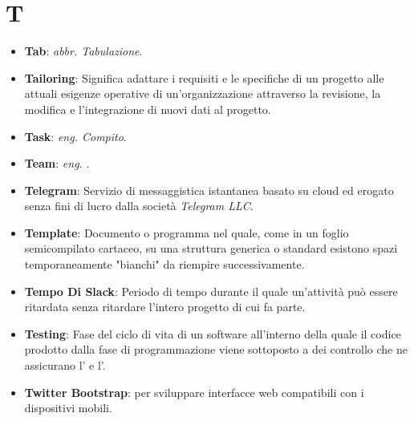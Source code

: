 \section*{T}
\begin{itemize}
	\item
	\textbf{Tab}: \textit{abbr. Tabulazione}.
	\item
	\textbf{Tailoring}: Significa adattare i requisiti e le specifiche di un progetto alle attuali esigenze operative di un'organizzazione attraverso la revisione, la modifica e l'integrazione di nuovi dati al progetto.
	\item
	\textbf{Task}: \textit{eng. Compito}.
	\item
	\textbf{Team}: \textit{eng. }.
	\item
	\textbf{Telegram}: Servizio di messaggistica istantanea basato su cloud ed erogato senza fini di lucro dalla società \textit{Telegram LLC}.
	\item
	\textbf{Template}: Documento o programma nel quale, come in un foglio semicompilato cartaceo, su una struttura generica o standard esistono spazi temporaneamente "bianchi" da riempire successivamente.
	\item
	\textbf{Tempo Di Slack}: Periodo di tempo durante il quale un'attività può essere ritardata senza ritardare l'intero progetto di cui fa parte.
	\item
	\textbf{Testing}: Fase del ciclo di vita di un software all'interno della quale il codice prodotto dalla fase di programmazione viene sottoposto a dei controllo che ne assicurano l' e l'.
	\item
	\textbf{Twitter Bootstrap}:  per sviluppare interfacce web compatibili con i dispositivi mobili.
\end{itemize}
\newpage